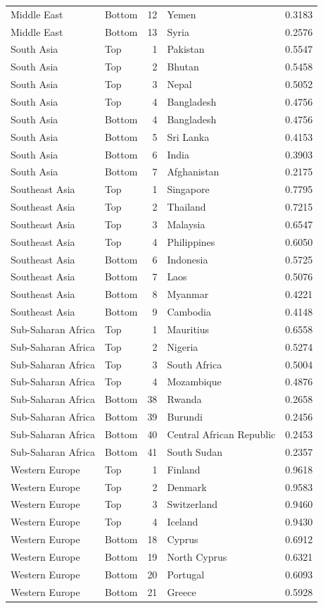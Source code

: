 \begin{table}
\begin{tabular}{llrlr}
Middle East & Bottom & 12 & Yemen & 0.3183 \\
Middle East & Bottom & 13 & Syria & 0.2576 \\
South Asia & Top & 1 & Pakistan & 0.5547 \\
South Asia & Top & 2 & Bhutan & 0.5458 \\
South Asia & Top & 3 & Nepal & 0.5052 \\
South Asia & Top & 4 & Bangladesh & 0.4756 \\
South Asia & Bottom & 4 & Bangladesh & 0.4756 \\
South Asia & Bottom & 5 & Sri Lanka & 0.4153 \\
South Asia & Bottom & 6 & India & 0.3903 \\
South Asia & Bottom & 7 & Afghanistan & 0.2175 \\
Southeast Asia & Top & 1 & Singapore & 0.7795 \\
Southeast Asia & Top & 2 & Thailand & 0.7215 \\
Southeast Asia & Top & 3 & Malaysia & 0.6547 \\
Southeast Asia & Top & 4 & Philippines & 0.6050 \\
Southeast Asia & Bottom & 6 & Indonesia & 0.5725 \\
Southeast Asia & Bottom & 7 & Laos & 0.5076 \\
Southeast Asia & Bottom & 8 & Myanmar & 0.4221 \\
Southeast Asia & Bottom & 9 & Cambodia & 0.4148 \\
Sub-Saharan Africa & Top & 1 & Mauritius & 0.6558 \\
Sub-Saharan Africa & Top & 2 & Nigeria & 0.5274 \\
Sub-Saharan Africa & Top & 3 & South Africa & 0.5004 \\
Sub-Saharan Africa & Top & 4 & Mozambique & 0.4876 \\
Sub-Saharan Africa & Bottom & 38 & Rwanda & 0.2658 \\
Sub-Saharan Africa & Bottom & 39 & Burundi & 0.2456 \\
Sub-Saharan Africa & Bottom & 40 & Central African Republic & 0.2453 \\
Sub-Saharan Africa & Bottom & 41 & South Sudan & 0.2357 \\
Western Europe & Top & 1 & Finland & 0.9618 \\
Western Europe & Top & 2 & Denmark & 0.9583 \\
Western Europe & Top & 3 & Switzerland & 0.9460 \\
Western Europe & Top & 4 & Iceland & 0.9430 \\
Western Europe & Bottom & 18 & Cyprus & 0.6912 \\
Western Europe & Bottom & 19 & North Cyprus & 0.6321 \\
Western Europe & Bottom & 20 & Portugal & 0.6093 \\
Western Europe & Bottom & 21 & Greece & 0.5928 \\
\bottomrule
\end{tabular}
\end{table}
